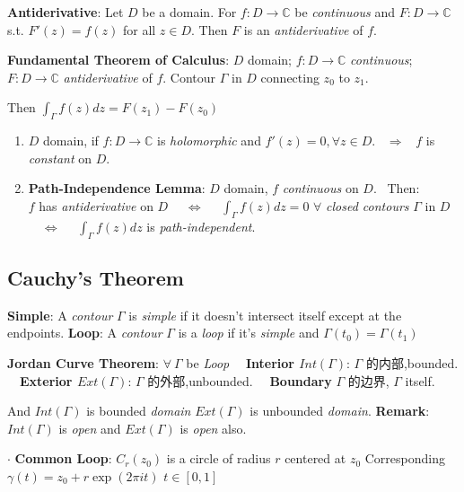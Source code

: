\documentclass[9pt]{article}
\begin{document}
\textbf{Antiderivative}: {\small Let $D$ be a domain. For $f:D\to\mathbb{C}$ be \textit{continuous} and $F:D\to\mathbb{C}$ s.t. $F'(z)=f(z)$ for all $z\in D$. Then $F$ is an \textit{antiderivative} of $f$.}

\textbf{Fundamental Theorem of Calculus}: {\small $D$ domain; $f:D\to\mathbb{C}$ \textit{continuous}; $F:D\to\mathbb{C}$ \textit{antiderivative} of $f$. Contour $\Gamma$ in $D$ connecting $z_0$ to $z_1$.}

\hspace{160pt} Then $\int_{\Gamma}f(z)dz = F(z_1)-F(z_0)$

\begin{enumerate}[itemsep=-2pt, topsep=-2pt]
    \item $D$ domain, if $f:D\to\mathbb{C}$ is \textit{holomorphic} and $f'(z)=0,\forall z\in D$. \ $\Rightarrow$ \ $f$ is \textit{constant} on $D$.
    \item \textbf{Path-Independence Lemma}: $D$ domain, $f$ \textit{continuous} on $D$. \ Then: \\
    $f$ has \textit{antiderivative} on $D$ \ \ $\Leftrightarrow$ \ \ $\int_{\Gamma}f(z)dz=0$ $\forall$ \textit{closed contours} $\Gamma$ in $D$ \ \ $\Leftrightarrow$ \ \ $\int_{\Gamma}f(z)dz$ is \textit{path-independent}.
\end{enumerate}


\subsection{Cauchy's Theorem} %

\textbf{Simple}: {\small A \textit{contour} $\Gamma$ is \textit{simple} if it doesn't intersect itself except at the endpoints.} \quad \textbf{Loop}: {\small A \textit{contour} $\Gamma$ is a \textit{loop} if it's \textit{simple} and $\Gamma(t_0)=\Gamma(t_1)$}

\textbf{Jordan Curve Theorem}: {\small $\forall \ \Gamma$ be \textit{Loop} \ \ \textbf{Interior $Int(\Gamma)$}: {\footnotesize $\Gamma$ 的内部,bounded.} \ \ \textbf{Exterior $Ext(\Gamma)$}: {\footnotesize $\Gamma$ 的外部,unbounded.} \ \ \textbf{Boundary} {\footnotesize $\Gamma$ 的边界, $\Gamma$ itself.}}

\quad And $Int(\Gamma)$ is bounded \textit{domain} \quad $Ext(\Gamma)$ is unbounded \textit{domain}. \quad \textbf{Remark}: $Int(\Gamma)$ is \textit{open} and $Ext(\Gamma)$ is \textit{open} also.

$\cdot$ \textbf{Common Loop}: $C_r(z_0)$ is a circle of radius $r$ centered at $z_0$ \quad Corresponding $\gamma(t)=z_0+r\exp(2\pi i t)$ $t\in[0,1]$
\end{document}
